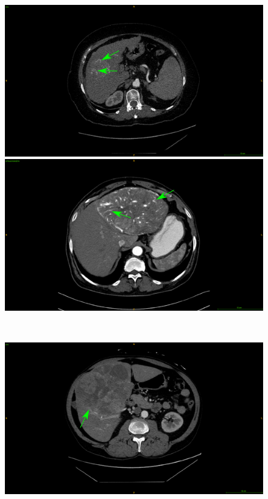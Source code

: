 \begin{figure}[!ht]
	\centering
	\begin{minipage}{0.45\linewidth}
		\includegraphics[width=\linewidth]{../Contributions/images/ImagingTraits/ResizeGDB_internalArteries}
	\end{minipage} \hspace{-0.1cm}
	\begin{minipage}{0.45\linewidth}
		\includegraphics[width=\linewidth]{../Contributions/images/ImagingTraits/ResizeTCIA_internalArteries}
	\end{minipage} \\
	\begin{minipage}{0.45\linewidth}
		\includegraphics[width=\linewidth]{../Contributions/images/ImagingTraits/ResizeGDB_texturalHeterogeneity}

\end{minipage}
\end{figure}
